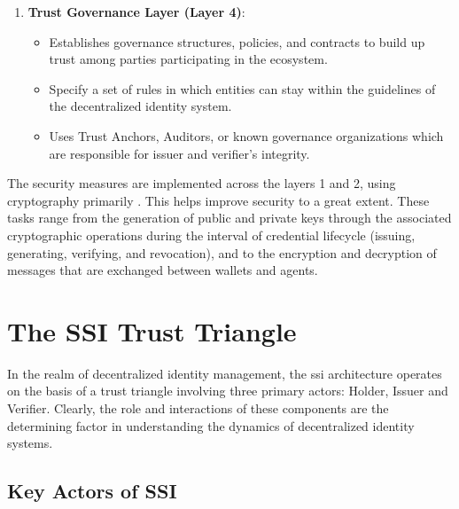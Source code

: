 \begin{enumerate}
  \item \textbf{Trust Governance Layer (Layer 4)}:
  \begin{itemize}
    \item Establishes governance structures, policies, and contracts to build up trust among parties participating in the ecosystem.
    \item Specify a set of rules in which entities can stay within the guidelines of the decentralized identity system.
    \item Uses Trust Anchors, Auditors, or known governance organizations which are responsible for issuer and verifier’s integrity.
  \end{itemize}
\end{enumerate}

The security measures are implemented across the layers 1 and 2, using cryptography primarily \cite{DIDarchitecture}. This helps improve security to a great extent. These tasks range from the 
generation of public and private keys through the associated cryptographic operations during the interval of credential lifecycle (issuing, generating, verifying, and 
revocation), and to the encryption and decryption of messages that are exchanged between wallets and agents.

\section{The SSI Trust Triangle}

In the realm of decentralized identity management, the \gls{ssi} architecture operates on the basis of a trust triangle involving three primary actors: 
Holder, Issuer and Verifier. Clearly, the role and interactions of these components are the determining factor in understanding the dynamics of decentralized identity systems.

\subsection{Key Actors of SSI}

